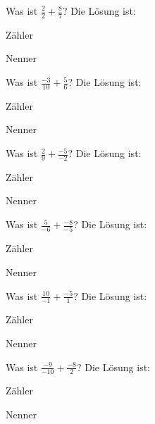 \documentclass{ximera}
\begin{document}
\begin{shuffle}
    


\begin{question}
Was ist $\frac{2}{2} + \frac{8}{7}$?
Die Lösung ist:
\begin{solution}
Zähler 
\end{solution}
\begin{solution}
Nenner 
\end{solution}
\end{question}


\begin{question}
Was ist $\frac{-3}{10} + \frac{5}{6}$?
Die Lösung ist:
\begin{solution}
Zähler 
\end{solution}
\begin{solution}
Nenner 
\end{solution}
\end{question}


\begin{question}
Was ist $\frac{2}{9} + \frac{-5}{-2}$?
Die Lösung ist:
\begin{solution}
Zähler 
\end{solution}
\begin{solution}
Nenner 
\end{solution}
\end{question}


\begin{question}
Was ist $\frac{5}{-6} + \frac{-8}{-5}$?
Die Lösung ist:
\begin{solution}
Zähler 
\end{solution}
\begin{solution}
Nenner 
\end{solution}
\end{question}


\begin{question}
Was ist $\frac{10}{-1} + \frac{-5}{1}$?
Die Lösung ist:
\begin{solution}
Zähler 
\end{solution}
\begin{solution}
Nenner 
\end{solution}
\end{question}


\begin{question}
Was ist $\frac{-9}{-10} + \frac{-8}{2}$?
Die Lösung ist:
\begin{solution}
Zähler 
\end{solution}
\begin{solution}
Nenner 
\end{solution}
\end{question}



\end{shuffle}
\end{document}
